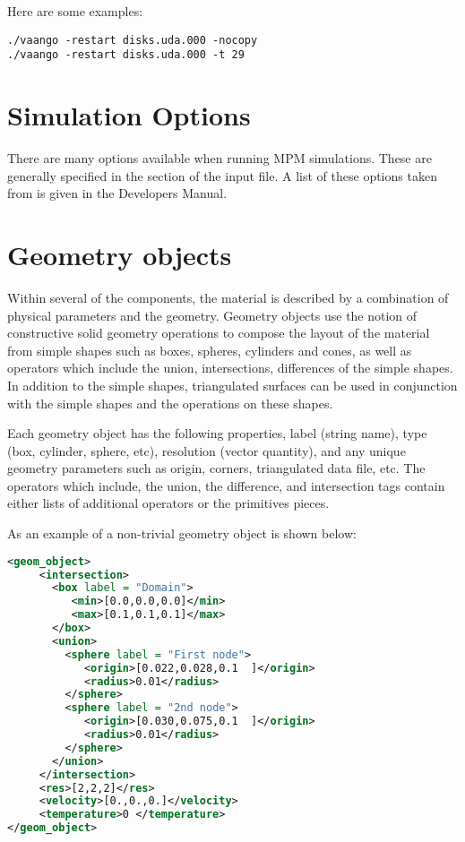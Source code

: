 Here are some examples:

\begin{lstlisting}[backgroundcolor=\color{background}]
./vaango -restart disks.uda.000 -nocopy
./vaango -restart disks.uda.000 -t 29
\end{lstlisting}
%

\section{Simulation Options} \label{Sec:SimulationOptions}


There are many options available when running MPM simulations.  These
are generally specified in the  section of the input file.
A list of these options taken from 
  is given in the \Vaango
Developers Manual.

\section{Geometry objects} \label{Sec:GeometryObjects}

Within several of the components, the material is described by a
combination of physical parameters and the geometry.  Geometry objects
use the notion of constructive solid geometry operations to compose
the layout of the material from simple shapes such as boxes, spheres,
cylinders and cones, as well as operators which include the union,
intersections, differences of the simple shapes.  In addition to the
simple shapes, triangulated surfaces can be used in conjunction with
the simple shapes and the operations on these shapes.

Each geometry object has the following properties, label (string
name), type (box, cylinder, sphere, etc), resolution (vector
quantity), and any unique geometry parameters such as origin, corners,
triangulated data file, etc.  The operators which include, the union,
the difference, and intersection tags contain either lists of
additional operators or the primitives pieces.

As an example of a non-trivial geometry object is shown below:

\begin{lstlisting}[language=XML]
<geom_object>
     <intersection>
       <box label = "Domain">
          <min>[0.0,0.0,0.0]</min>
          <max>[0.1,0.1,0.1]</max>
       </box>
       <union>
         <sphere label = "First node">
            <origin>[0.022,0.028,0.1  ]</origin>
            <radius>0.01</radius>
         </sphere>
         <sphere label = "2nd node">
            <origin>[0.030,0.075,0.1  ]</origin>
            <radius>0.01</radius>
         </sphere>
       </union>
     </intersection>
     <res>[2,2,2]</res>
     <velocity>[0.,0.,0.]</velocity>
     <temperature>0 </temperature>
</geom_object>
\end{lstlisting}

